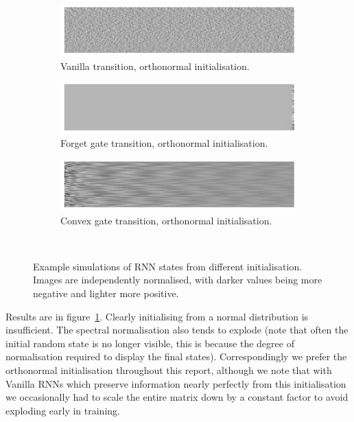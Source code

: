 \begin{figure}
\begin{subfigure}[t]{0.3\textwidth}
\includegraphics[width=\textwidth]{appendix/init/vanillaorth}
\caption{Vanilla transition, orthonormal initialisation.}
\end{subfigure}\hfill
\begin{subfigure}[t]{0.3\textwidth}
\includegraphics[width=\textwidth]{appendix/init/lstmorth}
\caption{Forget gate transition, orthonormal initialisation.}
\end{subfigure}\hfill
\begin{subfigure}[t]{0.3\textwidth}
\includegraphics[width=\textwidth]{appendix/init/gruorth}
\caption{Convex gate transition, orthonormal initialisation.}
\end{subfigure}\\

\caption[Simulated RNN states from various initialisations]{Example simulations of RNN states from different initialisation. Images are
independently normalised, with darker values being more negative and lighter more positive.}
\label{fig:inits}
\end{figure}

Results are in figure~\ref{fig:inits}. Clearly initialising from a normal distribution is
insufficient. The spectral normalisation also tends to explode (note that often the initial
random state is no longer visible, this is because the degree of normalisation required
to display the final states). Correspondingly we prefer the orthonormal initialisation
throughout this report, although we note that with Vanilla RNNs which preserve information
nearly perfectly from this initialisation we occasionally had to scale the entire matrix down
by a constant factor to avoid exploding early in training.


